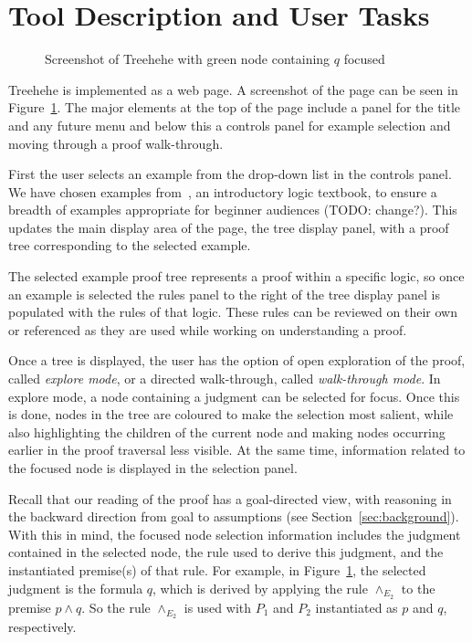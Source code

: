 \documentclass[conference]{IEEEtran}
\newcommand{\projectname}{Treehehe}
\begin{document}
\section{Tool Description and User Tasks}
\label{sec:tooldesc}

\begin{figure}

\begin{center}
\end{center}

\caption{Screenshot of \projectname{} with green node containing $q$ focused}
\label{fig:screenshot}

\end{figure}

\projectname{} is implemented as a web page. A screenshot of the page can be seen in Figure~\ref{fig:screenshot}. The major elements at the top of the page include a panel for the title and any future menu and below this a controls panel for example selection and moving through a proof walk-through.

First the user selects an example from the drop-down list in the controls panel. We have chosen examples from~\cite{logicincs-huth+ryan}, an introductory logic textbook, to ensure a breadth of examples appropriate for beginner audiences (TODO: change?). This updates the main display area of the page, the tree display panel, with a proof tree corresponding to the selected example.

The selected example proof tree represents a proof within a specific logic, so once an example is selected the rules panel to the right of the tree display panel is populated with the rules of that logic. These rules can be reviewed on their own or referenced as they are used while working on understanding a proof.

Once a tree is displayed, the user has the option of open exploration of the proof, called \textit{explore mode}, or a directed walk-through, called \textit{walk-through mode}. In explore mode, a node containing a judgment can be selected for focus. Once this is done, nodes in the tree are coloured to make the selection most salient, while also highlighting the children of the current node and making nodes occurring earlier in the proof traversal less visible. At the same time, information related to the focused node is displayed in the selection panel.

Recall that our reading of the proof has a goal-directed view, with reasoning in the backward direction from goal to assumptions (see Section~\ref{sec:background}). With this in mind, the focused node selection information includes the judgment contained in the selected node, the rule used to derive this judgment, and the instantiated premise(s) of that rule. For example, in Figure~\ref{fig:screenshot}, the selected judgment is the formula $q$, which is derived by applying the rule $\wedge_{E_2}$ to the premise $p \wedge q$. So the rule $\wedge_{E_2}$ is used with $P_1$ and $P_2$ instantiated as $p$ and $q$, respectively.
\end{document}

